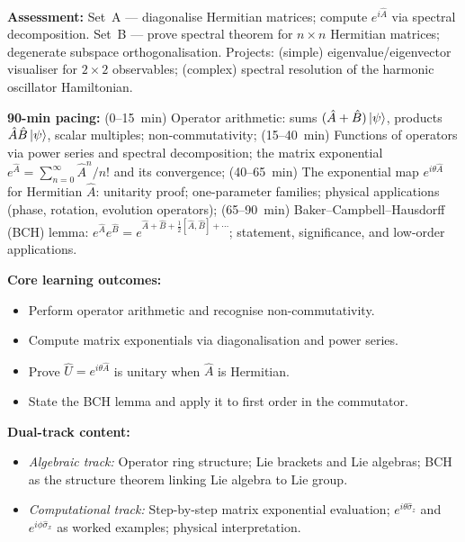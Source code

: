 \documentclass[11pt,a4paper]{article}
\begin{document}
\begin{tcolorbox}[modulebox, title={Module~I.1 --- Lecture L03: Observables, Hermitian Operators, and the Spectral Theorem}]
\medskip\textbf{Assessment:}
Set~A --- diagonalise Hermitian matrices; compute $e^{i\hat{A}}$ via spectral decomposition.
Set~B --- prove spectral theorem for $n\times n$ Hermitian matrices; degenerate subspace orthogonalisation.
Projects: (simple) eigenvalue/eigenvector visualiser for $2\times 2$ observables; (complex) spectral resolution
of the harmonic oscillator Hamiltonian.
\end{tcolorbox}

\medskip

\begin{tcolorbox}[modulebox, title={Module~I.1 --- Lecture L04: Operator Algebra and the Exponential Map}]
\textbf{90-min pacing:} (0--15~min) Operator arithmetic: sums $(\hat{A}+\hat{B})\ket{\psi}$,
products $\hat{A}\hat{B}\ket{\psi}$, scalar multiples; non-commutativity;
(15--40~min) Functions of operators via power series and spectral decomposition;
the matrix exponential $e^{\hat{A}} = \sum_{n=0}^\infty \hat{A}^n/n!$ and its convergence;
(40--65~min) The exponential map $e^{i\theta\hat{A}}$ for Hermitian $\hat{A}$: unitarity proof;
one-parameter families; physical applications (phase, rotation, evolution operators);
(65--90~min) Baker--Campbell--Hausdorff (BCH) lemma: $e^{\hat{A}}e^{\hat{B}} = e^{\hat{A}+\hat{B}+\frac{1}{2}[\hat{A},\hat{B}]+\cdots}$;
statement, significance, and low-order applications.

\medskip\textbf{Core learning outcomes:}
\begin{itemize}[leftmargin=1.4em,topsep=2pt,itemsep=1pt]
  \item Perform operator arithmetic and recognise non-commutativity.
  \item Compute matrix exponentials via diagonalisation and power series.
  \item Prove $\hat{U}=e^{i\theta\hat{A}}$ is unitary when $\hat{A}$ is Hermitian.
  \item State the BCH lemma and apply it to first order in the commutator.
\end{itemize}

\medskip\textbf{Dual-track content:}
\begin{itemize}[leftmargin=1.4em,topsep=2pt,itemsep=1pt]
  \item \textit{Algebraic track:} Operator ring structure; Lie brackets and Lie algebras;
    BCH as the structure theorem linking Lie algebra to Lie group.
  \item \textit{Computational track:} Step-by-step matrix exponential evaluation;
    $e^{i\theta\hat{\sigma}_z}$ and $e^{i\phi\hat{\sigma}_x}$ as worked examples; physical interpretation.
\end{itemize}


\end{tcolorbox}
\end{document}
